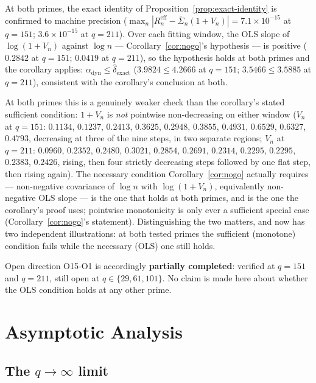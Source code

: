 \documentclass[11pt,a4paper]{article}
\newcommand{\Sn}{\bar{\Sigma}_n}
\newcommand{\dexact}{\hat{\delta}_{\mathrm{exact}}}
\newcommand{\Reff}{R_n^{\mathrm{eff}}}
\begin{document}
At both primes, the exact identity of Proposition~\ref{prop:exact-identity}
is confirmed to machine precision
($\max_n|\Reff-\Sn(1+V_n)| = 7.1\times10^{-15}$ at $q=151$;
$3.6\times10^{-15}$ at $q=211$).
Over each fitting window, the OLS slope of $\log(1+V_n)$ against $\log n$
--- Corollary~\ref{cor:nogo}'s hypothesis --- is positive
($0.2842$ at $q=151$; $0.0419$ at $q=211$), so the hypothesis holds at
both primes and the corollary applies:
$\alpha_{\mathrm{dyn}} \leq \dexact$
($3.9824 \leq 4.2666$ at $q=151$; $3.5466 \leq 3.5885$ at $q=211$),
consistent with the corollary's conclusion at both.

At both primes this is a genuinely weaker check than the corollary's stated
sufficient condition: $1+V_n$ is \emph{not} pointwise non-decreasing on
either window
($V_n$ at $q=151$: $0.1134$, $0.1237$, $0.2413$, $0.3625$, $0.2948$,
$0.3855$, $0.4931$, $0.6529$, $0.6327$, $0.4793$, decreasing at three of
the nine steps, in two separate regions;
$V_n$ at $q=211$: $0.0960$, $0.2352$, $0.2480$, $0.3021$, $0.2854$,
$0.2691$, $0.2314$, $0.2295$, $0.2295$, $0.2383$, $0.2426$, rising, then
four strictly decreasing steps followed by one flat step, then rising
again).
The necessary condition Corollary~\ref{cor:nogo} actually requires ---
non-negative covariance of $\log n$ with $\log(1+V_n)$, equivalently
non-negative OLS slope --- is the one that holds at both primes, and is
the one the corollary's proof uses; pointwise monotonicity is only ever a
sufficient special case (Corollary~\ref{cor:nogo}'s statement).
Distinguishing the two matters, and now has two independent illustrations:
at both tested primes the sufficient (monotone) condition fails while the
necessary (OLS) one still holds.

Open direction O15-O1 is accordingly \textbf{partially completed}: verified
at $q=151$ and $q=211$, still open at $q\in\{29,61,101\}$.
No claim is made here about whether the OLS condition holds at any other
prime.

\section{Asymptotic Analysis}
\label{sec:asymptotic}

\subsection{The \texorpdfstring{$q \to \infty$}{q to infinity} limit}
\end{document}
